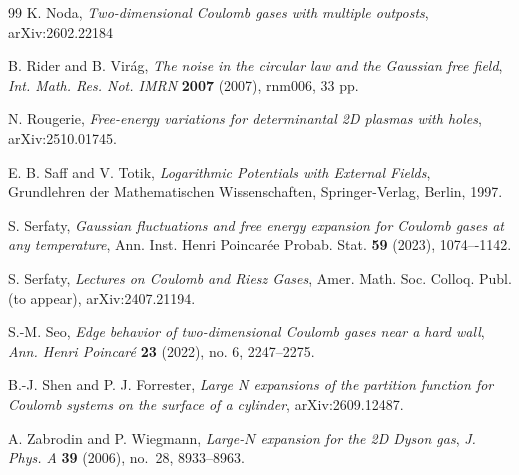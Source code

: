 \documentclass[a4paper]{article}
\numberwithin{equation}{section}
\begin{document}
\begin{thebibliography}{99}
K. Noda, \emph{Two-dimensional Coulomb gases with multiple outposts}, 	arXiv:2602.22184 

B. Rider and B. Vir\'{a}g,
\emph{The noise in the circular law and the Gaussian free field},
\textit{Int. Math. Res. Not. IMRN} \textbf{2007} (2007), rnm006, 33 pp.

N. Rougerie, \emph{Free-energy variations for determinantal 2D plasmas with holes}, arXiv:2510.01745.

 E. B. Saff and V. Totik, \emph{Logarithmic Potentials with External Fields},  Grundlehren der Mathematischen Wissenschaften, Springer-Verlag, Berlin, 1997.

S. Serfaty, \emph{Gaussian fluctuations and free energy expansion for Coulomb gases at any temperature}, Ann. Inst. Henri Poincar\'{e}e Probab. Stat. \textbf{59} (2023), 1074–-1142. 




S. Serfaty, \emph{Lectures on Coulomb and Riesz Gases}, Amer. Math. Soc. Colloq. Publ. (to appear), arXiv:2407.21194.

 S.-M. Seo, \emph{Edge behavior of two-dimensional Coulomb gases near a hard wall}, \textit{Ann. Henri Poincar\'{e}} \textbf{23} (2022), no. 6, 2247--2275.

B.-J. Shen and P. J. Forrester, 
\emph{Large N expansions of the partition function for Coulomb systems on the surface of a cylinder}, arXiv:2609.12487.


A. Zabrodin and P. Wiegmann,
\emph{Large-$N$ expansion for the 2D Dyson gas},
\textit{J. Phys. A} \textbf{39} (2006), no.~28, 8933--8963.

\end{thebibliography}
\end{document}
